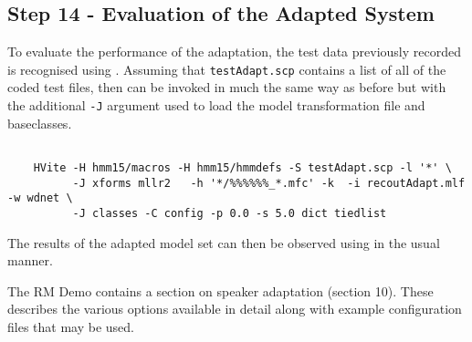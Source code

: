 \subsection{Step 14 - Evaluation of the Adapted System}

To evaluate the performance of the adaptation, the test data previously recorded 
is recognised using . Assuming that \texttt{testAdapt.scp} contains a list 
of all of the coded test files, then  can be invoked in much the same way 
as before but with the additional \texttt{-J} argument used to load the model 
transformation file and  baseclasses.

\begin{verbatim}

    HVite -H hmm15/macros -H hmm15/hmmdefs -S testAdapt.scp -l '*' \ 
          -J xforms mllr2   -h '*/%%%%%%_*.mfc' -k  -i recoutAdapt.mlf -w wdnet \ 
          -J classes -C config -p 0.0 -s 5.0 dict tiedlist

\end{verbatim}

\noindent
The results of the adapted model set can then be observed using  
in the usual manner.
 
The RM Demo contains a section on speaker adaptation (section 10). These describes
the various options available  in detail along with example configuration files that
may be used.

